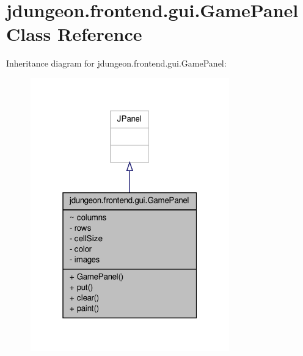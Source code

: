 \hypertarget{classjdungeon_1_1frontend_1_1gui_1_1_game_panel}{
\section{jdungeon.frontend.gui.GamePanel Class Reference}
\label{classjdungeon_1_1frontend_1_1gui_1_1_game_panel}
}


Inheritance diagram for jdungeon.frontend.gui.GamePanel:
\nopagebreak
\begin{figure}[H]
\begin{center}
\leavevmode
\includegraphics[width=244pt]{classjdungeon_1_1frontend_1_1gui_1_1_game_panel__inherit__graph}
\end{center}
\end{figure}


